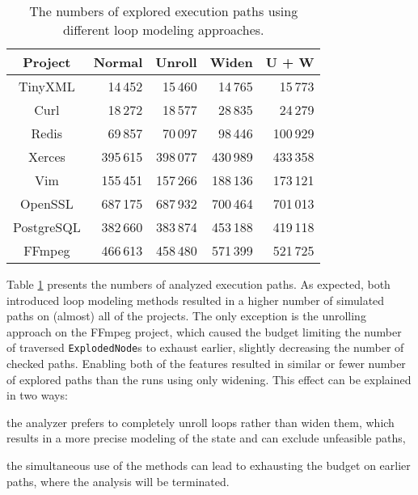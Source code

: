 \begin{table}[!htb]
	\centering
\begin{tabular}{ |c||r|r|r|r| } 
	\hline
	Project & Normal & Unroll & Widen & U + W \\
	\hline \hline
	TinyXML & 14\,452 & 15\,460 & 14\,765 & 15\,773 \\ 
	\hline
	Curl & 18\,272 & 18\,577 & 28\,835 & 24\,279 \\
	\hline
	Redis & 69\,857 & 70\,097 & 98\,446 & 100\,929 \\ 
	\hline
	Xerces & 395\,615 & 398\,077 & 430\,989 & 433\,358 \\ 
	\hline
	Vim & 155\,451 & 157\,266 & 188\,136 & 173\,121 \\ 
	\hline
	OpenSSL & 687\,175 & 687\,932 & 700\,464 & 701\,013 \\ 
	\hline
	PostgreSQL & 382\,660 & 383\,874 & 453\,188 & 419\,118  \\ 
	\hline
	FFmpeg & 466\,613 & 458\,480 & 571\,399 & 521\,725  \\ 		
	\hline
\end{tabular}
\caption{The numbers of explored execution paths using different loop modeling
approaches.}\label{tab:pathnum}
\end{table}
Table \ref{tab:pathnum} presents the numbers of analyzed execution paths.
As expected, both introduced loop modeling methods resulted in a higher number of
simulated paths on (almost) all of the projects. The only exception is the unrolling 
approach on the FFmpeg project, which caused the budget limiting the number of 
traversed \texttt{ExplodedNode}s to exhaust earlier, slightly decreasing 
the number of checked paths. Enabling both of the features resulted in similar or 
fewer number of explored paths than the runs using only widening. 
This effect can be explained in two ways:   
\begin{enumerate*} [label={(\arabic*)}, noitemsep]
	\item the analyzer prefers to completely unroll loops rather than widen them, 
    which results in a more precise modeling of the state and can exclude unfeasible 
    paths,
	\item the simultaneous use of the methods can lead to exhausting the budget on earlier paths, where the analysis will be terminated.
\end{enumerate*}

